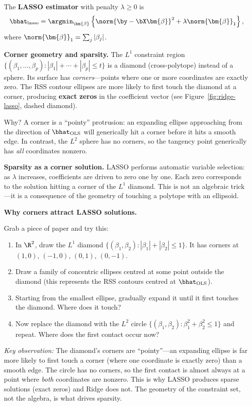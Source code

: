 \begin{definition}
The \textbf{LASSO estimator} with penalty $\lambda\ge 0$ is
\[
  \bhat_{\text{lasso}}
  = \argmin_{\bm{\beta}}\left\{
      \norm{\by-\bX\bm{\beta}}^2 + \lambda\norm{\bm{\beta}}_1
    \right\},
\]
where $\norm{\bm{\beta}}_1 = \sum_j|\beta_j|$.
\end{definition}

\noindent\textbf{Corner geometry and sparsity.}
The $L^1$ constraint region
$\{(\beta_1,\dots,\beta_p) : |\beta_1|+\cdots+|\beta_p| \le t\}$
is a diamond (cross-polytope) instead of a sphere.
Its surface has \emph{corners}---points where one or more coordinates
are exactly zero.
The RSS contour ellipses are more likely to first touch the diamond
at a corner, producing \textbf{exact zeros} in the coefficient vector
(see Figure~\ref{fig:ridge-lasso}, dashed diamond).

Why?
A corner is a ``pointy'' protrusion: an expanding ellipse approaching
from the direction of $\bhat_{\text{OLS}}$ will generically hit a
corner before it hits a smooth edge.
In contrast, the $L^2$ sphere has no corners, so the tangency point
generically has \emph{all} coordinates nonzero.

\medskip
\noindent\textbf{Sparsity as a corner solution.}
LASSO performs automatic variable selection: as $\lambda$ increases,
coefficients are driven to zero one by one.
Each zero corresponds to the solution hitting a corner of the $L^1$
diamond.
This is not an algebraic trick---it is a consequence of the geometry
of touching a polytope with an ellipsoid.

\begin{stopandthink}
\textbf{Why corners attract LASSO solutions.}

Grab a piece of paper and try this:
\begin{enumerate}[nosep]
  \item In $\R^2$, draw the $L^1$ diamond
        $\{(\beta_1, \beta_2) : |\beta_1| + |\beta_2| \le 1\}$.
        It has corners at $(1,0)$, $(-1,0)$, $(0,1)$, $(0,-1)$.
  \item Draw a family of concentric ellipses centred at some point
        outside the diamond (this represents the RSS contours centred
        at $\bhat_{\text{OLS}}$).
  \item Starting from the smallest ellipse, gradually expand it until
        it first touches the diamond. Where does it touch?
  \item Now replace the diamond with the $L^2$ circle
        $\{(\beta_1, \beta_2) : \beta_1^2 + \beta_2^2 \le 1\}$
        and repeat. Where does the first contact occur now?
\end{enumerate}
\emph{Key observation:}
The diamond's corners are ``pointy''---an expanding ellipse is far more
likely to first touch a corner (where one coordinate is exactly zero)
than a smooth edge.
The circle has no corners, so the first contact is almost always at a
point where \emph{both} coordinates are nonzero.
This is why LASSO produces sparse solutions (exact zeros) and Ridge
does not.
The geometry of the constraint set, not the algebra, is what drives
sparsity.
\end{stopandthink}



